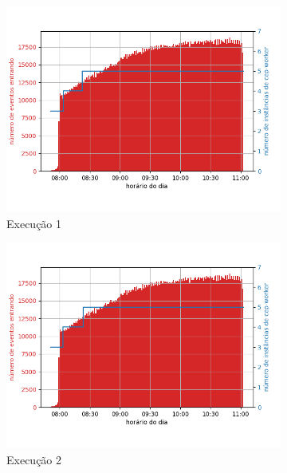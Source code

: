 \begin{figure}[p]
\begin{subfigure}{.5\textwidth}
  \centering
  \includegraphics[width=\linewidth]{figuras/graphics/carga_e_workers_horario5-dez-su.png}  
  \caption{Execução 1}
  \label{fig:cewh-5-dez-su}
\end{subfigure}
\begin{subfigure}{.5\textwidth}
  \centering
  \includegraphics[width=\linewidth]{figuras/graphics/carga_e_workers_horario7-dez-su.png}  
  \caption{Execução 2}
  \label{fig:cewh-7-dez-su}
\end{subfigure}
\begin{subfigure}{.5\textwidth}

\end{subfigure}
\end{figure}
